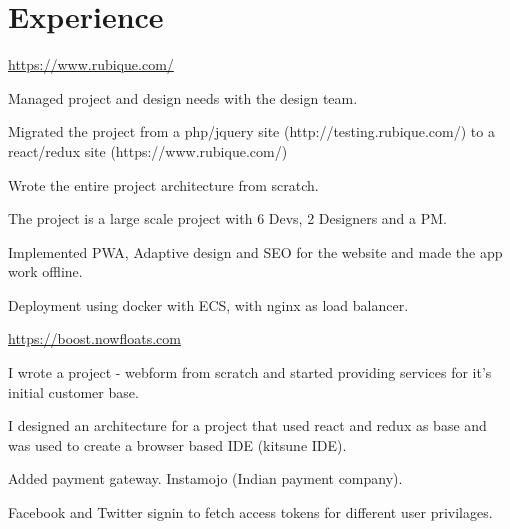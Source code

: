 \documentclass[]{deedy-resume-openfont}
\begin{document}
\hfill
\begin{minipage}[t]{0.66\textwidth}


\section{Experience}


{ \url{ https://www.rubique.com/ } }\\
\vspace{\topsep} %
\begin{tightemize}
\item Managed project and design needs with the design team.
\item Migrated the project from a php/jquery site (http://testing.rubique.com/) to a react/redux site (https://www.rubique.com/)
\item Wrote the entire project architecture from scratch.
\item The project is a large scale project with 6 Devs, 2 Designers and a PM.
\item Implemented PWA, Adaptive design and SEO for the website and made the app work offline.
\item Deployment using docker with ECS, with nginx as load balancer.
\end{tightemize}
\sectionsep


{ \url{ https://boost.nowfloats.com } }\\
\begin{tightemize}
\item I wrote a project - webform from scratch and started providing services for it's initial customer base.
\item I designed an architecture for a project that used react and redux as base and was used to create a browser based IDE (kitsune IDE).
\item Added payment gateway. Instamojo (Indian payment company).
\item Facebook and Twitter signin to fetch access tokens for different user privilages.
\vspace{\topsep} %
\end{tightemize}


\end{minipage}
\end{document}
